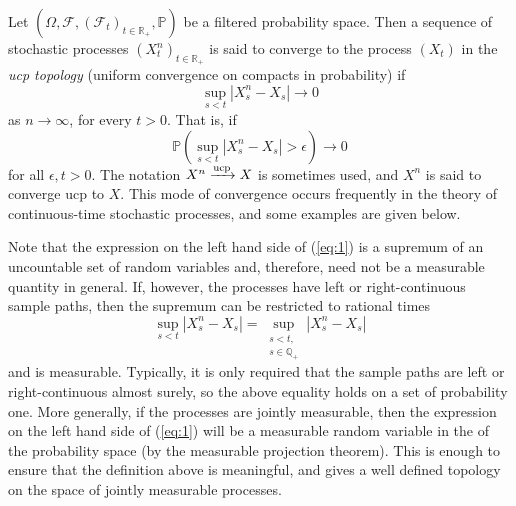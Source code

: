 \documentclass[12pt]{article}
\begin{document}

Let $(\Omega,\mathcal{F},(\mathcal{F}_t)_{t\in\mathbb{R}_+},\mathbb{P})$ be a filtered probability space. Then a sequence of stochastic processes $(X^n_t)_{t\in\mathbb{R}_+}$ is said to converge to the process $(X_t)$ in the \emph{ucp topology} (uniform convergence on compacts in probability) if
\begin{equation}\label{eq:1}
\sup_{s< t}|X^n_s-X_s|\rightarrow 0
\end{equation}
 as $n\rightarrow\infty$, for every $t> 0$. That is, if
\begin{equation*}
\mathbb{P}(\sup_{s< t}|X^n_s-X_s|>\epsilon)\rightarrow 0
\end{equation*}
for all $\epsilon,t>0$.
The notation $X^n\xrightarrow{\rm ucp} X$ is sometimes used, and $X^n$ is said to converge ucp to $X$.
This mode of convergence occurs frequently in the theory of continuous-time stochastic processes, and some examples are given below.

Note that the expression on the left hand side of (\ref{eq:1}) is a supremum of an uncountable set of random variables and, therefore, need not be a measurable quantity in general.
If, however, the processes have left or right-continuous sample paths, then the supremum can be restricted to rational times
\begin{equation*}
\sup_{s< t}|X^n_s-X_s|
=\sup_{\substack{s<t,\\s\in\mathbb{Q}_+}}|X^n_s-X_s|
\end{equation*}
and is measurable. Typically, it is only required that the sample paths are left or right-continuous almost surely, so the above equality holds on a set of probability one.
More generally, if the processes are jointly measurable, then the expression on the left hand side of (\ref{eq:1}) will be a measurable random variable in the  of the probability space (by the measurable projection theorem).
This is enough to ensure that the definition above is meaningful, and gives a well defined topology on the space of jointly measurable processes.
\end{document}

